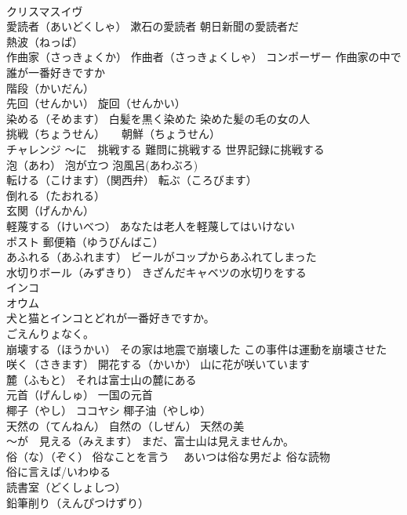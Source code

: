 \documentclass[8pt]{extreport}
\begin{document}
\begin{CJK}{UTF8}{min}
\\	クリスマスイヴ
\\	愛読者（あいどくしゃ） 漱石の愛読者 朝日新聞の愛読者だ
\\	熱波（ねっぱ）
\\	作曲家（さっきょくか） 作曲者（さっきょくしゃ） コンポーザー 作曲家の中で誰が一番好きですか
\\	階段（かいだん）
\\	先回（せんかい） 旋回（せんかい）
\\	染める（そめます） 白髪を黒く染めた 染めた髪の毛の女の人
\\	挑戦（ちょうせん）　　朝鮮（ちょうせん）
\\	チャレンジ ～に　挑戦する 難問に挑戦する 世界記録に挑戦する
\\	泡（あわ） 泡が立つ 泡風呂(あわぶろ)
\\	転ける（こけます）（関西弁） 転ぶ（ころびます）
\\	倒れる（たおれる）
\\	玄関（げんかん）
\\	軽蔑する（けいべつ） あなたは老人を軽蔑してはいけない
\\	ポスト 郵便箱（ゆうびんばこ）
\\	あふれる（あふれます） ビールがコップからあふれてしまった
\\	水切りボール（みずきり） きざんだキャベツの水切りをする
\\	インコ　
\\	オウム　
\\	犬と猫とインコとどれが一番好きですか。
\\	ごえんりょなく。
\\	崩壊する（ほうかい） その家は地震で崩壊した この事件は運動を崩壊させた
\\	咲く（さきます） 開花する（かいか） 山に花が咲いています
\\	麓（ふもと） それは富士山の麓にある
\\	元首（げんしゅ） 一国の元首
\\	椰子（やし） ココヤシ 椰子油（やしゆ）
\\	天然の（てんねん） 自然の（しぜん） 天然の美
\\	～が　見える（みえます） まだ、富士山は見えませんか。
\\	俗（な）（ぞく） 俗なことを言う　 あいつは俗な男だよ 俗な読物　 
\\	俗に言えば/いわゆる
\\	読書室（どくしょしつ）
\\	鉛筆削り（えんぴつけずり）

\end{CJK}
\end{document}

